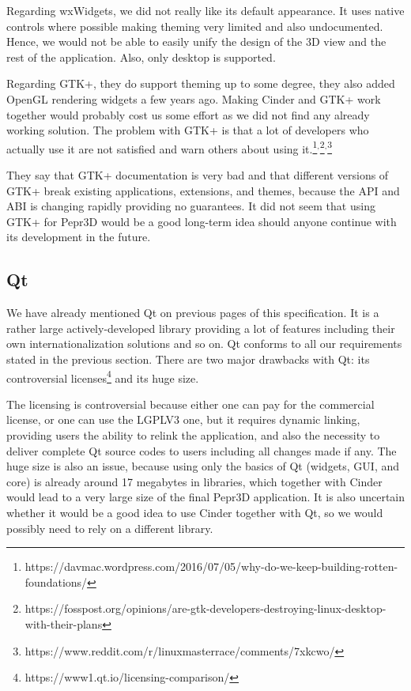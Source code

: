 Regarding wxWidgets, we did not really like its default appearance.
It uses native controls where possible making theming very limited and also undocumented.
Hence, we would not be able to easily unify the design of the 3D view and the rest of the application.
Also, only desktop is supported.

Regarding GTK+, they do support theming up to some degree, they also added OpenGL rendering widgets a few years ago.
Making Cinder and GTK+ work together would probably cost us some effort as we did not find any already working solution.
The problem with GTK+ is that a lot of developers who actually use it are not satisfied and warn others about using it.\footnote{https://davmac.wordpress.com/2016/07/05/why-do-we-keep-building-rotten-foundations/}$^{,}$\footnote{https://fosspost.org/opinions/are-gtk-developers-destroying-linux-desktop-with-their-plans}$^{,}$\footnote{https://www.reddit.com/r/linuxmasterrace/comments/7xkcwo/}

They say that GTK+ documentation is very bad and that different versions of GTK+ break existing applications, extensions, and themes, because the API and ABI is changing rapidly providing no guarantees.
It did not seem that using GTK+ for Pepr3D would be a good long-term idea should anyone continue with its development in the future.

\subsection{Qt}

We have already mentioned Qt on previous pages of this specification.
It is a rather large actively-developed library providing a lot of features including their own internationalization solutions and so on.
Qt conforms to all our requirements stated in the previous section.
There are two major drawbacks with Qt: its controversial licenses\footnote{https://www1.qt.io/licensing-comparison/} and its huge size.

The licensing is controversial because either one can pay for the commercial license, or one can use the LGPLV3 one, but it requires dynamic linking, providing users the ability to relink the application, and also the necessity to deliver complete Qt source codes to users including all changes made if any.
The huge size is also an issue, because using only the basics of Qt (widgets, GUI, and core) is already around 17 megabytes in libraries, which together with Cinder would lead to a very large size of the final Pepr3D application.
It is also uncertain whether it would be a good idea to use Cinder together with Qt, so we would possibly need to rely on a different library.

